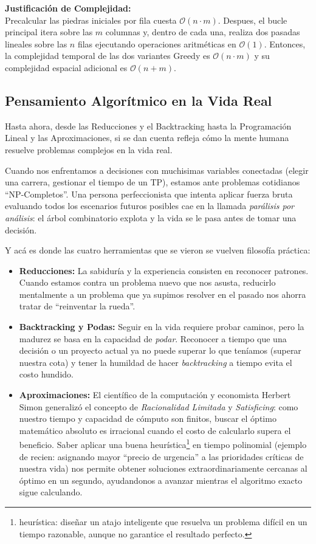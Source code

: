 \noindent\textbf{Justificación de Complejidad:} \\
Precalcular las piedras iniciales por fila cuesta $\mathcal{O}(n \cdot m)$. Despues, el bucle principal itera sobre las $m$ columnas y, dentro de cada una, realiza dos pasadas lineales sobre las $n$ filas ejecutando operaciones aritméticas en $\mathcal{O}(1)$. Entonces, la complejidad temporal de las dos variantes Greedy es $\mathcal{O}(n \cdot m)$ y su complejidad espacial adicional es $\mathcal{O}(n + m)$.

\subsection{Pensamiento Algorítmico en la Vida Real}

Hasta ahora, desde las Reducciones y el Backtracking hasta la Programación Lineal y las Aproximaciones, si se dan cuenta refleja cómo la mente humana resuelve problemas complejos en la vida real. 

Cuando nos enfrentamos a decisiones con muchisimas variables conectadas (elegir una carrera, gestionar el tiempo de un TP), estamos ante problemas cotidianos ``NP-Completos''. Una persona perfeccionista que intenta aplicar fuerza bruta evaluando todos los escenarios futuros posibles cae en la llamada \textit{parálisis por análisis}: el árbol combinatorio explota y la vida se le pasa antes de tomar una decisión.

Y acá es donde las cuatro herramientas que se vieron se vuelven filosofía práctica:
\begin{itemize}
    \item \textbf{Reducciones:} La sabiduría y la experiencia consisten en reconocer patrones. Cuando estamos contra un problema nuevo que nos asusta, reducirlo mentalmente a un problema que ya supimos resolver en el pasado nos ahorra tratar de ``reinventar la rueda''.
    \item \textbf{Backtracking y Podas:} Seguir en la vida requiere probar caminos, pero la madurez se basa en la capacidad de \textit{podar}. Reconocer a tiempo que una decisión o un proyecto actual ya no puede superar lo que teníamos (superar nuestra cota) y tener la humildad de hacer \textit{backtracking} a tiempo evita el costo hundido.
    \item \textbf{Aproximaciones:} El científico de la computación y economista Herbert Simon generalizó el concepto de \textit{Racionalidad Limitada} y \textit{Satisficing}: como nuestro tiempo y capacidad de cómputo son finitos, buscar el óptimo matemático absoluto es irracional cuando el costo de calcularlo supera el beneficio. Saber aplicar una buena heurística\footnote{heurística: diseñar un atajo inteligente que resuelva un problema difícil en un tiempo razonable, aunque no garantice el resultado perfecto.} en tiempo polinomial (ejemplo de recien: asignando mayor ``precio de urgencia'' a las prioridades críticas de nuestra vida) nos permite obtener soluciones extraordinariamente cercanas al óptimo en un segundo, ayudandonos a avanzar mientras el algoritmo exacto sigue calculando.
\end{itemize}



